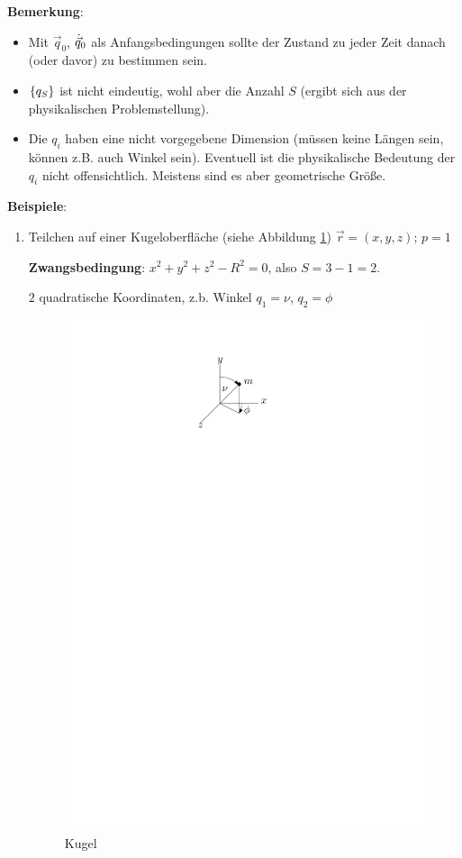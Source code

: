 \textbf{Bemerkung}: 
\begin{itemize}
	\item Mit $\vec{q}_0$, $\dot{\vec{q}}_0$ als Anfangsbedingungen sollte der Zustand zu jeder Zeit danach (oder davor) zu bestimmen sein.
	\item $\left\{ q_S \right\}$ ist nicht eindeutig, wohl aber die Anzahl $S$ (ergibt sich aus der physikalischen Problemstellung).
	\item Die $q_i$ haben eine nicht vorgegebene Dimension (müssen keine Längen sein, können z.B. auch Winkel sein). Eventuell ist die physikalische Bedeutung der $q_i$ nicht offensichtlich. Meistens sind es aber geometrische Größe.
\end{itemize}

\textbf{Beispiele}:
\begin{enumerate}
	\item Teilchen auf einer Kugeloberfläche (siehe Abbildung \ref{fig:ch1_kugel}) $\vec{r} = (x, y, z)$; $p = 1$ 
	
	\textbf{Zwangsbedingung}: $x^2 + y^2 + z^2 - R^2 = 0$, also $S = 3 - 1 = 2$. 
	
	$2$ quadratische Koordinaten, z.b. Winkel $q_1 = \nu$, $q_2 = \phi$
	\begin{figure}
		\centering
		\includegraphics{figures/ch1/kugel}
		\caption{Kugel}
		\label{fig:ch1_kugel}
	\end{figure}
	

\end{enumerate}
